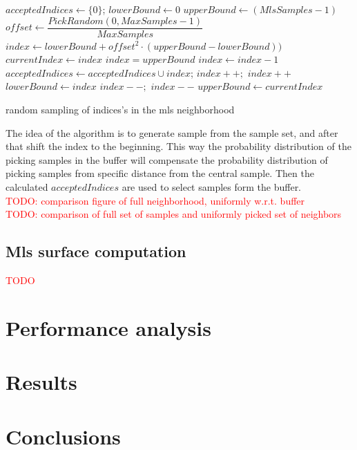 \begin{algorithm}[H]
	\scriptsize
	\begin{algorithmic}
			\State $acceptedIndices \gets \{0\}$;
			\State $lowerBound \gets 0$
			\State $upperBound \gets (MlsSamples - 1)$
				\State $offset \gets \dfrac{PickRandom(0, MaxSamples - 1)}{MaxSamples}$
				\State $index \gets lowerBound + offset^2 \cdot (upperBound - lowerBound))$
				\State $currentIndex \gets index$
						\State $index = upperBound$
					\Else
						\State $index \gets index - 1$
					\EndIf
				\EndWhile
				\State $acceptedIndices \gets acceptedIndices \cup index$;
					\State $index++;$
						\State $index++$
					\EndWhile
					\State $lowerBound \gets index$
				\Else 
						\State $index--;$
							\State $index--$
						\EndWhile
						\State $upperBound \gets currentIndex$
					\EndIf
				\EndIf
			\EndFor
	\end{algorithmic}
	\caption{random sampling of indices's in the mls neighborhood}
	\label{alg:mls_montecarlo_sampling}
\end{algorithm}
The idea of the algorithm is to generate sample from the sample set, and after that shift the index to the beginning. This way the probability distribution of the picking samples in the buffer will compensate the probability distribution of picking samples from specific distance from the central sample.
Then the calculated $acceptedIndices$ are used to select samples form the buffer.\\
\textcolor{red}{TODO: comparison figure of full neighborhood, uniformly w.r.t. buffer }\\
\textcolor{red}{TODO: comparison of full set of samples and uniformly picked set of neighbors}\\

\subsection{Mls surface computation}
\textcolor{red}{TODO}
\section{Performance analysis}
\section{Results}
\section{Conclusions}